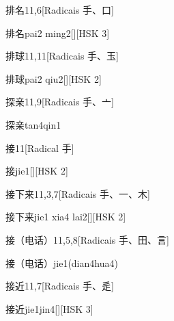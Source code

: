 \begin{entry}{排名}{11,6}[Radicais ⼿、⼝]
  \begin{phonetics}{排名}{pai2 ming2}[][HSK 3]
  \end{phonetics}
\end{entry}

\begin{entry}{排球}{11,11}[Radicais ⼿、⽟]
  \begin{phonetics}{排球}{pai2 qiu2}[][HSK 2]
  \end{phonetics}
\end{entry}

\begin{entry}{探亲}{11,9}[Radicais ⼿、⼇]
  \begin{phonetics}{探亲}{tan4qin1}
  \end{phonetics}
\end{entry}

\begin{entry}{接}{11}[Radical ⼿]
  \begin{phonetics}{接}{jie1}[][HSK 2]
  \end{phonetics}
\end{entry}

\begin{entry}{接下来}{11,3,7}[Radicais ⼿、⼀、⽊]
  \begin{phonetics}{接下来}{jie1 xia4 lai2}[][HSK 2]
  \end{phonetics}
\end{entry}

\begin{entry}{接（电话）}{11,5,8}[Radicais ⼿、⽥、⾔]
  \begin{phonetics}{接（电话）}{jie1(dian4hua4)}
  \end{phonetics}
\end{entry}

\begin{entry}{接近}{11,7}[Radicais ⼿、⾡]
  \begin{phonetics}{接近}{jie1jin4}[][HSK 3]
  \end{phonetics}
\end{entry}


